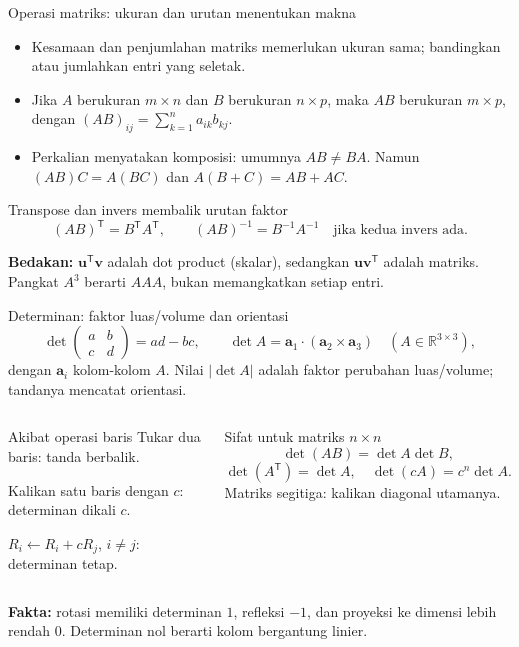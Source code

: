 \documentclass[11pt,aspectratio=169]{beamer}
\newcommand{\vect}[1]{\boldsymbol{#1}}
\newcommand{\R}{\mathbb{R}}
\begin{document}
\begin{frame}{Operasi matriks: ukuran dan urutan menentukan makna}
\small
\begin{itemize}
\item Kesamaan dan penjumlahan matriks memerlukan ukuran sama;
bandingkan atau jumlahkan entri yang seletak.
\item Jika $A$ berukuran $m\times n$ dan $B$ berukuran $n\times p$,
maka $AB$ berukuran $m\times p$, dengan $(AB)_{ij}=\sum_{k=1}^n a_{ik}b_{kj}$.
\item Perkalian menyatakan komposisi: umumnya $AB\ne BA$.
Namun $(AB)C=A(BC)$ dan $A(B+C)=AB+AC$.
\end{itemize}
\begin{block}{Transpose dan invers membalik urutan faktor}
\[
(AB)^{\mathsf T}=B^{\mathsf T}A^{\mathsf T},\qquad
(AB)^{-1}=B^{-1}A^{-1}\quad\text{jika kedua invers ada}.
\]
\end{block}
\textbf{Bedakan:} $\vect{u}^{\mathsf T}\vect{v}$ adalah dot product (skalar),
sedangkan $\vect{u}\vect{v}^{\mathsf T}$ adalah matriks.
Pangkat $A^3$ berarti $AAA$, bukan memangkatkan setiap entri.
\end{frame}

\begin{frame}{Determinan: faktor luas/volume dan orientasi}
\small
\[
\det\begin{pmatrix}a&b\\c&d\end{pmatrix}=ad-bc,\qquad
\det A=\vect{a}_1\cdot(\vect{a}_2\times\vect{a}_3)\quad(A\in\R^{3\times3}),
\]
dengan $\vect{a}_i$ kolom-kolom $A$. Nilai $|\det A|$ adalah faktor perubahan luas/volume;
tandanya mencatat orientasi.
\begin{columns}[T,onlytextwidth]
\begin{block}{Akibat operasi baris}
Tukar dua baris: tanda berbalik.\par\smallskip
Kalikan satu baris dengan $c$: determinan dikali $c$.\par\smallskip
$R_i\leftarrow R_i+cR_j$, $i\ne j$: determinan tetap.
\end{block}
\begin{block}{Sifat untuk matriks $n\times n$}
\[
\det(AB)=\det A\det B,
\]
\[
\det(A^{\mathsf T})=\det A,
\quad\det(cA)=c^n\det A.
\]
Matriks segitiga: kalikan diagonal utamanya.
\end{block}
\end{columns}
\medskip
\textbf{Fakta:} rotasi memiliki determinan $1$, refleksi $-1$, dan proyeksi
ke dimensi lebih rendah $0$. Determinan nol berarti kolom bergantung linier.
\end{frame}
\end{document}
